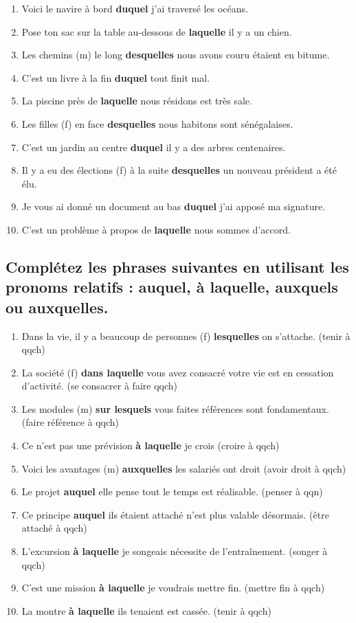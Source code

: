 \documentclass[12pt]{article}
\newcommand{\colo}[1]{{\color{blue}\textbf{#1}}}
\begin{document}
\begin{enumerate}
 \item Voici le navire à bord \colo{duquel} j’ai traversé les océans. \item Pose ton sac sur la table au-dessous de \colo{laquelle} il y a un chien. 
 \item Les chemins (m) le long \colo{desquelles} nous avons couru étaient en bitume. 
 \item C’est un livre à la fin \colo{duquel} tout finit mal. 
 \item La piscine près de \colo{laquelle} nous résidons est très sale. 
 \item Les filles (f) en face \colo{desquelles} nous habitons sont sénégalaises. 
 \item C’est un jardin au centre \colo{duquel} il y a des arbres centenaires.
 \item Il y a eu des élections (f) à la suite  \colo{desquelles} un nouveau président a été élu. 
 \item Je vous ai donné un document au bas \colo{duquel} j’ai apposé ma signature. 
 \item C’est un problème à propos de \colo{laquelle} nous sommes d’accord.
\end{enumerate}

\subsection{Complétez les phrases suivantes en utilisant les pronoms relatifs : auquel, à laquelle, auxquels ou auxquelles.} 
\begin{enumerate}
\item Dans la vie, il y a beaucoup de personnes (f) \colo{lesquelles} on s’attache. (tenir à qqch) 
\item La société (f) \colo{dans laquelle} vous avez consacré votre vie est en cessation d’activité. (se consacrer à faire qqch)
\item Les modules (m) \colo{sur lesquels} vous faites références sont fondamentaux. (faire référence à qqch)
\item Ce n’est pas une prévision \colo{à laquelle} je crois (croire à qqch) 
\item Voici les avantages (m) \colo{auxquelles} les salariés ont droit (avoir droit à qqch) 
\item Le projet \colo{auquel} elle pense tout le temps est réalisable. (penser à qqn) 
\item Ce principe \colo{auquel} ils étaient attaché n’est plus valable désormais. (être attaché à qqch) 
\item L’excursion \colo{à laquelle} je songeais nécessite de l’entraînement. (songer à qqch) 
\item C’est une mission \colo{à laquelle} je voudrais mettre fin. (mettre fin à qqch) 
\item La montre \colo{à laquelle} ils tenaient est cassée. (tenir à qqch)
\end{enumerate}
\end{document}
